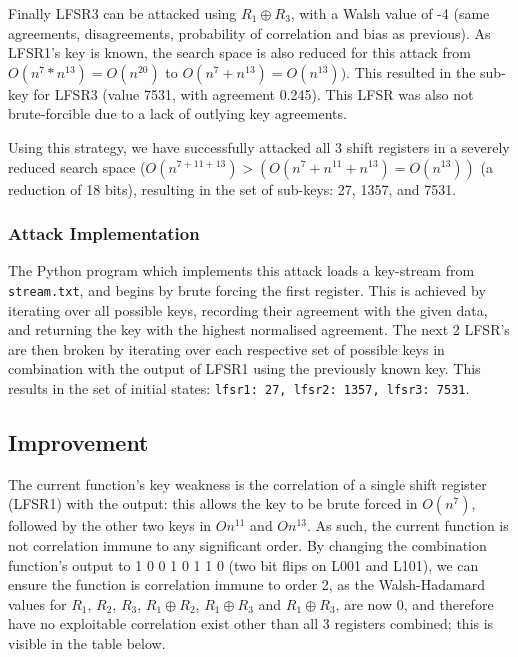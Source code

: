 \documentclass[british,11pt,a4paper]{article}
\begin{document}
Finally LFSR3 can be attacked using \(R_1 \oplus R_3\), with a Walsh value of -4 (same agreements, disagreements, probability of correlation and bias as previous).
As LFSR1's key is known, the search space is also reduced for this attack from \(O(n^{7} * n^{13})=O(n^{20})\) to \(O(n^7 + n^{13})=O(n^{13}))\). This resulted in the sub-key for LFSR3 (value 7531, with agreement 0.245). This LFSR was also not brute-forcible due to a lack of outlying key agreements.

Using this strategy, we have successfully attacked all 3 shift registers in a severely reduced search space (\(O(n^{7+11+13})>(O(n^{7}+n^{11}+n^{13})=O(n^{13}))\) (a reduction of 18 bits), resulting in the set of sub-keys: 27, 1357, and 7531.

\subsubsection{Attack Implementation}
The Python program which implements this attack loads a key-stream from \lstinline{stream.txt}, and begins by brute forcing the first register.
This is achieved by iterating over all possible keys, recording their agreement with the given data, and returning the key with the highest normalised agreement.
The next 2 LFSR's are then broken by iterating over each respective set of possible keys in combination with the output of LFSR1 using the previously known key.
This results in the set of initial states: \lstinline{lfsr1: 27, lfsr2: 1357, lfsr3: 7531}.

\subsection{Improvement}
The current function's key weakness is the correlation of a single shift register (LFSR1) with the output: this allows the key to be brute forced in \(O(n^7)\), followed by the other two keys in \(On^{11}\) and \(On^{13}\).
As such, the current function is not correlation immune to any significant order.
By changing the combination function's output to 1 0 0 1 0 1 1 0 (two bit flips on L001 and L101), we can ensure the function
is correlation immune to order 2, as the Walsh-Hadamard values for \(R_1\),
\(R_2\),  \(R_3\),  \(R_1 \oplus R_2\), \(R_1 \oplus R_3\) and \(R_1 \oplus R_3\), are now 0,
and therefore have no exploitable correlation exist other than all 3 registers combined; this is visible in the table below.
\end{document}
